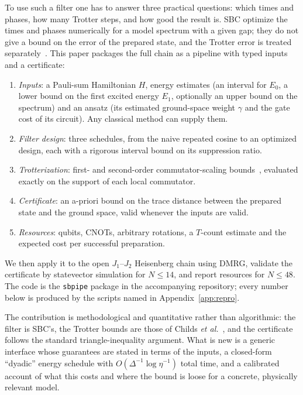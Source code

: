 \documentclass[aps,pra,twocolumn,superscriptaddress,nofootinbib]{revtex4-2}
\begin{document}
To use such a filter one has to answer three practical questions: which times and phases, how many
Trotter steps, and how good the result is. SBC optimize the times and phases numerically for a model
spectrum with a given gap; they do not give a bound on the error of the prepared state, and the
Trotter error is treated separately~\cite{Stetcu2023}. This paper packages the full chain as a pipeline
with typed inputs and a certificate:
\begin{enumerate}
\item \emph{Inputs}: a Pauli-sum Hamiltonian $H$, energy estimates (an interval for $E_0$, a lower
  bound on the first excited energy $E_1$, optionally an upper bound on the spectrum) and an ansatz
  (its estimated ground-space weight $\gamma$ and the gate cost of its circuit). Any classical method
  can supply them.
\item \emph{Filter design}: three schedules, from the naive repeated cosine to an optimized design,
  each with a rigorous interval bound on its suppression ratio.
\item \emph{Trotterization}: first- and second-order commutator-scaling bounds~\cite{Childs2021},
  evaluated exactly on the support of each local commutator.
\item \emph{Certificate}: an a-priori bound on the trace distance between the prepared state and the
  ground space, valid whenever the inputs are valid.
\item \emph{Resources}: qubits, CNOTs, arbitrary rotations, a $T$-count estimate and the expected cost
  per successful preparation.
\end{enumerate}
We then apply it to the open $J_1$--$J_2$ Heisenberg chain using DMRG, validate the certificate by
statevector simulation for $N\le14$, and report resources for $N\le48$. The code is the \texttt{sbpipe}
package in the accompanying repository; every number below is produced by the scripts named in
Appendix~\ref{app:repro}.

The contribution is methodological and quantitative rather than algorithmic: the filter is SBC's, the
Trotter bounds are those of Childs \emph{et al.}~\cite{Childs2021}, and the certificate follows the
standard triangle-inequality argument. What is new is a generic interface whose guarantees are stated
in terms of the inputs, a closed-form ``dyadic'' energy schedule with $O(\Delta^{-1}\log\eta^{-1})$
total time, and a calibrated account of what this costs and where the bound is loose for a concrete,
physically relevant model.
\end{document}
